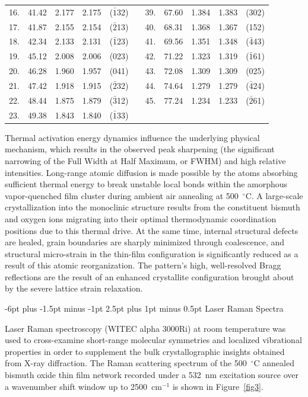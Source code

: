\documentclass[10pt]{NSP1}
\makeatletter
\renewcommand\subsection{\@startsection{subsection}{2}{\z@}%
  {-6pt plus -1.5pt minus -1pt}%
  {2.5pt plus 1pt minus 0.5pt}%
  {\normalsize\bfseries\itshape}}
\makeatother
\begin{document}
\begin{table}[t]
\begin{tabular}{ccccc|c|ccccc}
16. & 41.42 & 2.177 & 2.175 & ($\bar{1}$32)  & & 39. & 67.60 & 1.384 & 1.383 & (302)         \\
17. & 41.87 & 2.155 & 2.154 & ($\bar{2}$13)  & & 40. & 68.31 & 1.368 & 1.367 & (152)         \\
18. & 42.34 & 2.133 & 2.131 & ($\bar{1}$23)  & & 41. & 69.56 & 1.351 & 1.348 & ($\bar{4}$43) \\
19. & 45.12 & 2.008 & 2.006 & (023)          & & 42. & 71.22 & 1.323 & 1.319 & ($\bar{1}$61) \\
20. & 46.28 & 1.960 & 1.957 & (041)          & & 43. & 72.08 & 1.309 & 1.309 & (025)         \\
21. & 47.42 & 1.918 & 1.915 & ($\bar{2}$32)  & & 44. & 74.64 & 1.279 & 1.279 & ($\bar{4}$24) \\
22. & 48.44 & 1.875 & 1.879 & ($\bar{3}$12)  & & 45. & 77.24 & 1.234 & 1.233 & ($\bar{2}$61) \\
23. & 49.38 & 1.843 & 1.840 & ($\bar{1}$33)  & &     &       &       &       &               \\
\bottomrule
\end{tabular}
\end{table}

Thermal activation energy dynamics influence the underlying physical mechanism, which results in the observed peak sharpening (the significant narrowing of the Full Width at Half Maximum, or FWHM) and high relative intensities. Long-range atomic diffusion is made possible by the atoms absorbing sufficient thermal energy to break unstable local bonds within the amorphous vapor-quenched film cluster during ambient air annealing at 500~$^\circ$C. A large-scale crystallization into the monoclinic structure results from the constituent bismuth and oxygen ions migrating into their optimal thermodynamic coordination positions due to this thermal drive. At the same time, internal structural defects are healed, grain boundaries are sharply minimized through coalescence, and structural micro-strain in the thin-film configuration is significantly reduced as a result of this atomic reorganization. The pattern's high, well-resolved Bragg reflections are the result of an enhanced crystallite configuration brought about by the severe lattice strain relaxation.

\subsection{Laser Raman Spectra}

Laser Raman spectroscopy (WITEC alpha 3000Ri) at room temperature was used to cross-examine short-range molecular symmetries and localized vibrational properties in order to supplement the bulk crystallographic insights obtained from X-ray diffraction. The Raman scattering spectrum of the 500~$^\circ$C annealed bismuth oxide thin film network recorded under a 532~nm excitation source over a wavenumber shift window up to 2500~cm$^{-1}$ is shown in Figure~\ref{fig3}.
\end{document}
